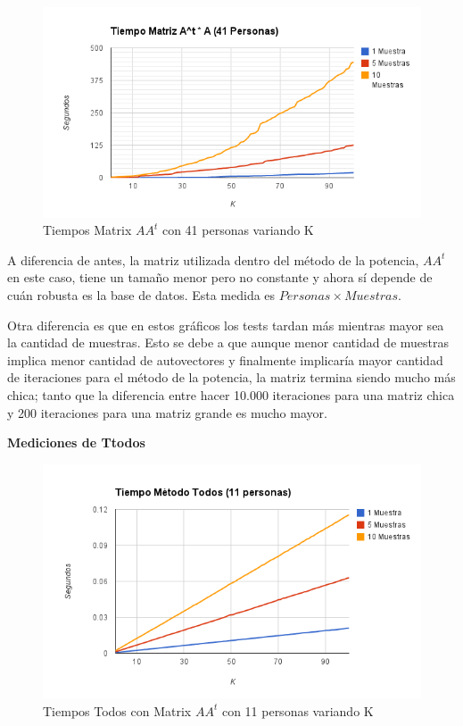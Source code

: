 \begin{figure}[H] \includegraphics[width=1\textwidth]{img/imagec.png} \caption{Tiempos Matrix $AA^t$
    con 41 personas variando K} \end{figure}

A diferencia de antes, la matriz utilizada dentro del m\'etodo de la potencia, $A A^t$ en este caso,
tiene un tama\~no menor pero no constante y ahora sí depende de cu\'an robusta es la base de datos.
Esta medida es $Personas \times Muestras$.

Otra diferencia es que en estos gráficos los tests tardan más mientras mayor sea la cantidad de
muestras. Esto se debe a que aunque menor cantidad de muestras implica menor cantidad de
autovectores y finalmente implicaría mayor cantidad de iteraciones para el método de la potencia, la
matriz termina siendo mucho más chica; tanto que la diferencia entre hacer 10.000 iteraciones para
una matriz chica y 200 iteraciones para una matriz grande es mucho mayor.


\textbf{Mediciones de Ttodos }

\begin{figure}[H] \includegraphics[width=1\textwidth]{img/imaged.png} \caption{Tiempos Todos con
    Matrix $AA^t$ con 11 personas variando K} \end{figure}

